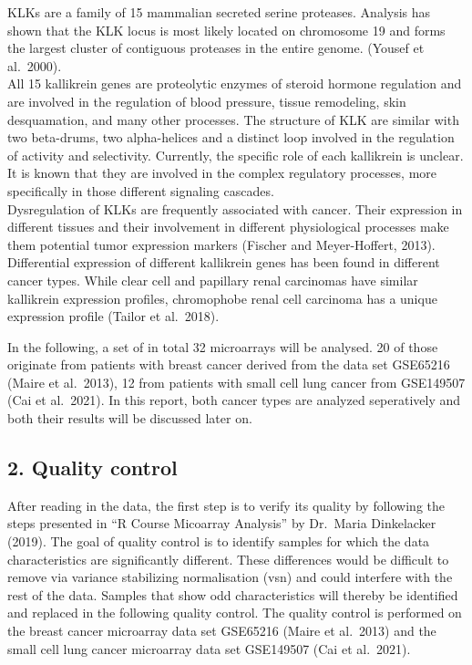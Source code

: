 \documentclass[
]{article}
\begin{document}
KLKs are a family of 15 mammalian secreted serine proteases. Analysis
has shown that the KLK locus is most likely located on chromosome 19 and
forms the largest cluster of contiguous proteases in the entire genome.
(Yousef et al.~2000).\\
All 15 kallikrein genes are proteolytic enzymes of steroid hormone
regulation and are involved in the regulation of blood pressure, tissue
remodeling, skin desquamation, and many other processes. The structure
of KLK are similar with two beta-drums, two alpha-helices and a distinct
loop involved in the regulation of activity and selectivity. Currently,
the specific role of each kallikrein is unclear. It is known that they
are involved in the complex regulatory processes, more specifically in
those different signaling cascades.\\
Dysregulation of KLKs are frequently associated with cancer. Their
expression in different tissues and their involvement in different
physiological processes make them potential tumor expression markers
(Fischer and Meyer-Hoffert, 2013).\\
Differential expression of different kallikrein genes has been found in
different cancer types. While clear cell and papillary renal carcinomas
have similar kallikrein expression profiles, chromophobe renal cell
carcinoma has a unique expression profile (Tailor et al.~2018).

In the following, a set of in total 32 microarrays will be analysed. 20
of those originate from patients with breast cancer derived from the
data set GSE65216 (Maire et al.~2013), 12 from patients with small cell
lung cancer from GSE149507 (Cai et al.~2021). In this report, both
cancer types are analyzed seperatively and both their results will be
discussed later on.

\hypertarget{quality-control}{%
\subsection{2. Quality control}\label{quality-control}}

After reading in the data, the first step is to verify its quality by
following the steps presented in ``R Course Micoarray Analysis'' by
Dr.~Maria Dinkelacker (2019). The goal of quality control is to identify
samples for which the data characteristics are significantly different.
These differences would be difficult to remove via variance stabilizing
normalisation (vsn) and could interfere with the rest of the data.
Samples that show odd characteristics will thereby be identified and
replaced in the following quality control. The quality control is
performed on the breast cancer microarray data set GSE65216 (Maire et
al.~2013) and the small cell lung cancer microarray data set GSE149507
(Cai et al.~2021).
\end{document}
